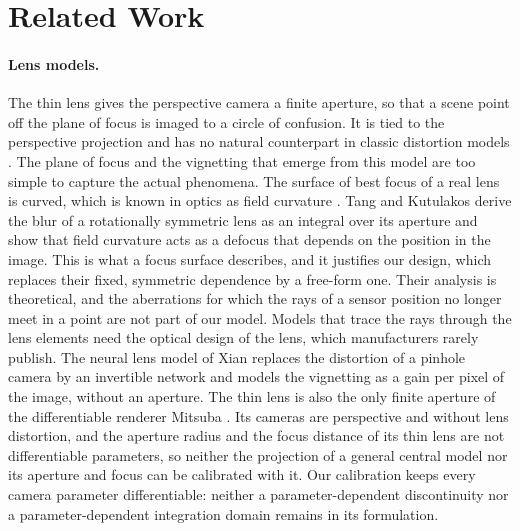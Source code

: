 \section{Related Work}
\label{sec:related-work}


\paragraph{Lens models.} The thin lens
\cite{Hecht+2023,pharr2023physically} gives the perspective camera a
finite aperture, so that a scene point off the plane of focus is
imaged to a circle of confusion. It is tied to the perspective projection and has
no natural counterpart in classic distortion models \cite{kannala-brandt, double-sphere, Brown1966DecenteringDO, Conrady1919DecentredL}. The plane of focus and the vignetting that emerge from this model are too simple to capture the actual phenomena. The
surface of best focus of a real lens is curved, which is known in
optics as field curvature \cite{Kingslake2010}. Tang and Kutulakos
\cite{tang2013aberrated} derive the blur of a rotationally symmetric
lens as an integral over its aperture and show that field curvature
acts as a defocus that depends on the position in the image. This is
what a focus surface describes, and it justifies our design, which
replaces their fixed, symmetric dependence by a free-form one. Their
analysis is theoretical, and the aberrations for which the rays of a
sensor position no longer meet in a point are not part of our model. Models that trace the
rays through the lens elements \cite{kolb1995realistic} need the
optical design of the lens, which manufacturers rarely publish. The
neural lens model of Xian \etal \cite{xian2023neurallens} replaces the
distortion of a pinhole camera by an invertible network and models the
vignetting as a gain per pixel of the image, without an aperture. The thin lens is also the only finite aperture of the
differentiable renderer Mitsuba
\cite{NimierDavidVicini2019Mitsuba2,Mitsuba3}. Its cameras are
perspective and without lens distortion, and the aperture radius and
the focus distance of its thin lens are not differentiable parameters,
so neither the projection of a general central model nor its aperture
and focus can be calibrated with it. Our calibration keeps every
camera parameter differentiable: neither a parameter-dependent
discontinuity nor a parameter-dependent integration domain remains in
its formulation.

